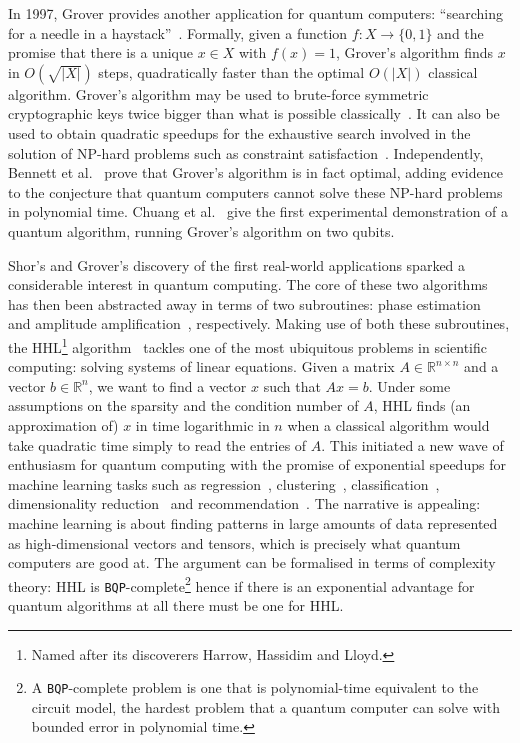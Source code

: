 In 1997, Grover provides another application for quantum computers: ``searching for a needle in a haystack''~\cite{Grover97}.
Formally, given a function $f : X \to \{0, 1\}$ and the promise that there is a unique $x \in X$ with $f(x) = 1$, Grover's algorithm finds $x$ in $O(\sqrt{|X|})$ steps, quadratically faster than the optimal $O(|X|)$ classical algorithm.
Grover's algorithm may be used to brute-force symmetric cryptographic keys twice bigger than what is possible classically~\cite{BernsteinEtAl09}.
It can also be used to obtain quadratic speedups for the exhaustive search involved in the solution of NP-hard problems such as constraint satisfaction~\cite{Ambainis04}.
Independently, Bennett et al.~\cite{BennettEtAl97} prove that Grover's algorithm is in fact optimal, adding evidence to the conjecture that quantum computers cannot solve these NP-hard problems in polynomial time.
Chuang et al.~\cite{ChuangEtAl98} give the first experimental demonstration of a quantum algorithm, running Grover's algorithm on two qubits.

Shor's and Grover's discovery of the first real-world applications sparked a considerable interest in quantum computing.
The core of these two algorithms has then been abstracted away in terms of two
subroutines: phase estimation~\cite{Kitaev95} and amplitude
amplification~\cite{BrassardEtAl02}, respectively.
Making use of both these subroutines, the HHL\footnote{Named after its discoverers Harrow, Hassidim and Lloyd.} algorithm~\cite{HarrowEtAl09} tackles one of the most ubiquitous problems in scientific computing: solving systems of linear equations.
Given a matrix $A \in \mathbb{R}^{n \times n}$ and a vector ${b} \in \mathbb{R}^{n}$, we want to find a vector ${x}$ such that $A {x} = {b}$.
Under some assumptions on the sparsity and the condition number of $A$, HHL finds (an approximation of) $x$ in time logarithmic in $n$ when a classical algorithm would take quadratic time simply to read the entries of $A$.
This initiated a new wave of enthusiasm for quantum computing with the promise of exponential speedups for machine learning tasks such as regression~\cite{WiebeEtAl12}, clustering~\cite{LloydEtAl13}, classification~\cite{RebentrostEtAl14}, dimensionality reduction~\cite{LloydEtAl14} and recommendation~\cite{KerenidisPrakash16}.
The narrative is appealing: machine learning is about finding patterns in large amounts of data represented as high-dimensional vectors and tensors, which is precisely what quantum computers are good at.
The argument can be formalised in terms of complexity theory: HHL is \texttt{BQP}-complete\footnote
{A \texttt{BQP}-complete problem is one that is polynomial-time  equivalent to the circuit model, the hardest problem that a quantum computer can solve with bounded error in polynomial time.}
hence if there is an exponential advantage for quantum algorithms at all there must be one for HHL.

